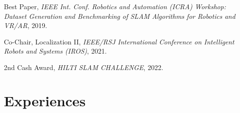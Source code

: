 \documentclass[margin]{res}
\begin{document}
\begin{resume}
		\par Best Paper,\textit{ IEEE Int. Conf. Robotics and Automation (ICRA) Workshop: Dataset Generation and Benchmarking of SLAM Algorithms for Robotics and VR/AR}, 2019.
						
		\par Co-Chair, Localization II, \textit{IEEE/RSJ International Conference on Intelligent Robots and Systems (IROS)}, 2021.
		
		\par 2nd Cash Award, \textit{HILTI SLAM CHALLENGE}, 2022.

		\section{Experiences}
		

\end{resume}
\end{document}
